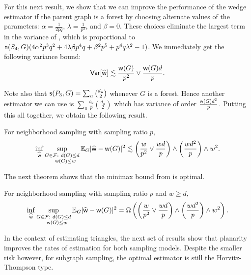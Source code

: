 For this next result, we show that we can improve the performance of the wedge estimator  if the parent graph is a forest by choosing alternate values of the parameters: $ \alpha = \frac{1}{2pq} $, $ \lambda = \frac{1}{p^2} $, and $ \beta = 0 $. These choices eliminate the largest term in the variance of , which is proportional to $ \mathsf{n}(S_4, G)(4\alpha^2p^3q^2+4\lambda\beta p^4q+\beta^2p^5+p^4q\lambda^2-1) $. We immediately get the following variance bound:
\begin{equation} \label{eq:variance-broken-forest}
\mathsf{Var}[\widehat{{\mathsf{w}}}] \lesssim \frac{{\mathsf{w}}(G)}{p^2} \vee \frac{{\mathsf{w}}(G)d}{p}.
\end{equation}

Note also that $ \mathsf{s}(P_3, G) = \sum_u \binom{d_u}{2} $ whenever $G$ is a forest. Hence another estimator we can use is $ \sum_u \frac{b_u}{p}\binom{d_u}{2} $ which has variance of order $ \frac{{\mathsf{w}}(G)d^2}{p} $. Putting this all together, we obtain the following result.
\begin{theorem} \label{thm:wedge-forest}
For neighborhood sampling with sampling ratio $ p $,
\begin{equation*}
\inf_{\widehat{{\mathsf{w}}}}\sup_{\substack{G\in {\mathcal{F}}: ~{\mathsf{d}}(G)\leq d\\ ~~~{\mathsf{w}}(G) \leq w}}\mathbb{E}_G|\widehat{{\mathsf{w}}}-{\mathsf{w}}(G)|^2 \lesssim \left(\frac{w}{p^{2}} \vee \frac{wd}{p} \right) \wedge \left(\frac{wd^2}{p}\right) \wedge w^2.
\end{equation*}
\end{theorem}

The next theorem shows that the minimax bound from  is optimal.

\begin{theorem}\label{thm:broken-forest}
For neighborhood sampling with sampling ratio $ p $ and $ w \geq d $,
\begin{equation*}
\inf_{\widehat{{\mathsf{w}}}}\sup_{\substack{G \in {\mathcal{F}}: ~{\mathsf{d}}(G)\leq d\\ ~~~{\mathsf{w}}(G) \leq w}}\mathbb{E}_G|\widehat{{\mathsf{w}}}-{\mathsf{w}}(G)|^2 = \Omega \left(\left(\frac{w}{p^2} \vee \frac{wd}{p} \right) \wedge \left(\frac{wd^2}{p}\right) \wedge w^2 \right).
\end{equation*}
\end{theorem}

In the context of estimating triangles, the next set of results show that planarity improves the rates of estimation for both sampling models. Despite the smaller risk however, for subgraph sampling, the optimal estimator is still the Horvitz-Thompson type.

